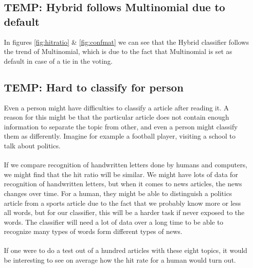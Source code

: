 \subsection{TEMP: Hybrid follows Multinomial due to default} %
\label{sub:temp_hybrid_follows_multinomial_due_to_default}
In figures \ref{fig:hitratio} \& \ref{fig:confmat} we can see that the Hybrid classifier follows the trend of Multinomial, which is due to the fact that Multinomial is set as default in case of a tie in the voting.

\subsection{TEMP: Hard to classify for person} %
\label{sub:temp_hard_to_classify_for_person}
Even a person might have difficulties to classify a article after reading it. A reason for this might be that the particular article does not contain enough information to separate the topic from other, and even a person might classify them as differently. Imagine for example a football player, visiting a school to talk about politics.
\\\\
If we compare recognition of handwritten letters done by humans and computers, we might find that the hit ratio will be similar. We might have lots of data for recognition of handwritten letters, but when it comes to news articles, the news changes over time. For a human, they might be able to distinguish a politics article from a sports article due to the fact that we probably know more or less all words, but for our classifier, this will be a harder task if never exposed to the words. The classifier will need a lot of data over a long time to be able to recognize many types of words form different types of news.
\\\\
If one were to do a test out of a hundred articles with these eight topics, it would be interesting to see on average how the hit rate for a human would turn out.
